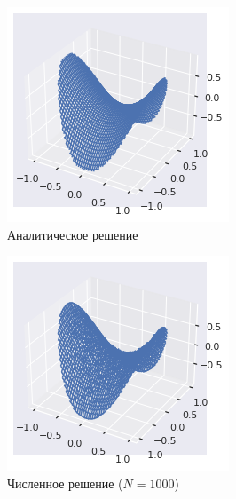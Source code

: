 \begin{figure}[tbp]
    \centering
    \begin{subfigure}[b]{0.48\textwidth}
        \centering
        \includegraphics[width=\textwidth]{resources/task8_analytical.png}
        \caption{Аналитическое решение}
    \end{subfigure}
    \hfill
    \begin{subfigure}[b]{0.48\textwidth}
        \centering
        \includegraphics[width=\textwidth]{resources/task8_numerical.png}
        \caption{Численное решение ($N=1000$)}
    \end{subfigure}
    \caption{}
    \label{dirMC}
\end{figure}